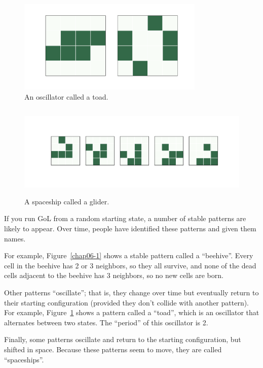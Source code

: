 \documentclass[12pt]{book}
\theoremstyle{exercise}
\begin{document}
\begin{figure}
\centerline{\includegraphics[height=1.75in]{figs/chap06-2.pdf}}
\caption{An oscillator called a toad.}
\label{chap06-2}
\end{figure}

\begin{figure}
\centerline{\includegraphics[height=1.75in]{figs/chap06-3.pdf}}
\caption{A spaceship called a glider.}
\label{chap06-3}
\end{figure}

If you run GoL from a random starting state, a number of stable
patterns are likely to appear.  Over time, people have identified
these patterns and given them names.


For example, Figure~\ref{chap06-1} shows a stable pattern called a
``beehive''.  Every cell in the beehive
has 2 or 3 neighbors, so they all survive, and none of the dead
cells adjacent to the beehive has 3 neighbors, so no new cells
are born.

Other patterns ``oscillate''; that is, they change over time but
eventually return to their starting configuration (provided
they don't collide with another pattern).  For example,
Figure~\ref{chap06-2} shows a pattern called a ``toad'', which
is an oscillator that alternates between two states.  The
``period'' of this oscillator is 2.


Finally, some patterns oscillate and return to the starting
configuration, but shifted in space.  Because these patterns 
seem to move, they are called ``spaceships''.
\end{document}

